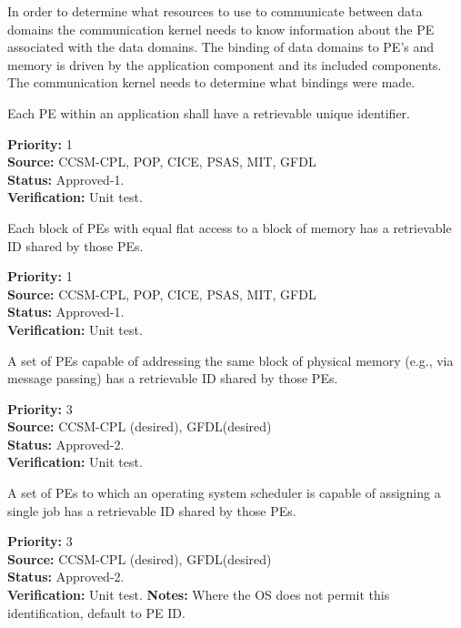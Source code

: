 In order to determine what resources to use to communicate between data domains 
the communication kernel needs to know information about the PE associated with the
data domains. The binding of data domains to PE's and memory is driven by the application
component and its included components. The communication kernel needs to determine 
what bindings were made.

Each PE within an application shall have a
retrievable unique identifier.

\begin{reqlist}
{\bf Priority:} 1 \\
{\bf Source:}  CCSM-CPL, POP, CICE, PSAS, MIT, GFDL \\
{\bf Status:} Approved-1. \\
{\bf Verification:} Unit test.
\end{reqlist}


Each block of PEs with equal flat access to a block of 
memory has a retrievable ID shared by those PEs. 

\begin{reqlist}
{\bf Priority:} 1 \\
{\bf Source:}  CCSM-CPL, POP, CICE, PSAS, MIT, GFDL \\
{\bf Status:} Approved-1. \\
{\bf Verification:} Unit test.
\end{reqlist}

A set of PEs capable of addressing the same block of physical
memory (e.g., via message passing) has a retrievable ID shared
by those PEs.

\begin{reqlist}
{\bf Priority:} 3 \\
{\bf Source:}  CCSM-CPL (desired), GFDL(desired)             \\
{\bf Status:} Approved-2. \\
{\bf Verification:} Unit test.
\end{reqlist}

A set of PEs to which an operating system scheduler is capable 
of assigning a single job has a retrievable ID shared by those
PEs.
\begin{reqlist}
{\bf Priority:} 3 \\
{\bf Source:}  CCSM-CPL (desired), GFDL(desired) \\
{\bf Status:} Approved-2. \\
{\bf Verification:} Unit test.
{\bf Notes:}  Where the OS does not permit this identification, default
  to PE ID.
\end{reqlist}


